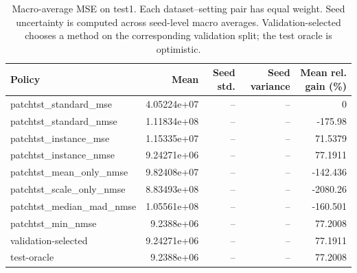 \begin{table}[htbp]
\centering
\caption{Macro-average MSE on test1. Each dataset--setting pair has equal weight. Seed uncertainty is computed across seed-level macro averages. Validation-selected chooses a method on the corresponding validation split; the test oracle is optimistic.}
\begin{tabular}{lrrrr}
\toprule
Policy & Mean & Seed std. & Seed variance & Mean rel. gain (\%) \\
\midrule
patchtst\_standard\_mse & 4.05224e+07 & -- & -- & 0 \\
patchtst\_standard\_nmse & 1.11834e+08 & -- & -- & -175.98 \\
patchtst\_instance\_mse & 1.15335e+07 & -- & -- & 71.5379 \\
patchtst\_instance\_nmse & 9.24271e+06 & -- & -- & 77.1911 \\
patchtst\_mean\_only\_nmse & 9.82408e+07 & -- & -- & -142.436 \\
patchtst\_scale\_only\_nmse & 8.83493e+08 & -- & -- & -2080.26 \\
patchtst\_median\_mad\_nmse & 1.05561e+08 & -- & -- & -160.501 \\
patchtst\_min\_nmse & 9.2388e+06 & -- & -- & 77.2008 \\
validation-selected & 9.24271e+06 & -- & -- & 77.1911 \\
\midrule
test-oracle & 9.2388e+06 & -- & -- & 77.2008 \\
\bottomrule
\end{tabular}
\end{table}

